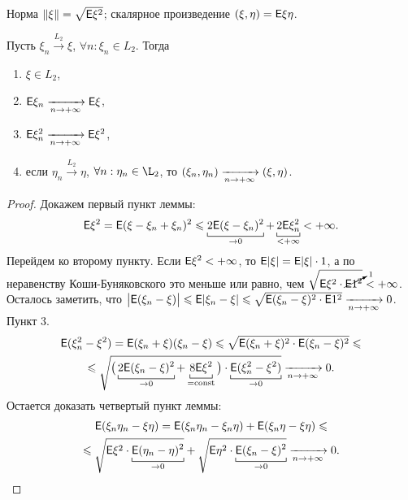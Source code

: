 Норма $ \| \xi \| = \sqrt{\mathsf{E} \xi^2}$;  скалярное произведение $(\xi, \eta) = \mathsf{E} \xi\eta$.
\begin{lemma}
	Пусть $\xi_n \xrightarrow{L_2} \xi$, $\forall n: \xi_n \in L_2$. Тогда
	\begin{enumerate}
		\item $\xi \in L_2$,
		\item $\mathsf{E}\xi_n \xrightarrow[n \rightarrow + \infty]{} \mathsf{E} \xi$,
		\item $\mathsf{E} \xi_n^2 \xrightarrow[n \rightarrow + \infty]{} \mathsf{E}\xi^2$,
		\item {если $\eta_n \xrightarrow{L_2} \eta$, $\forall n: \eta_n \in \L_2$, то $(\xi_n, \eta_n) \xrightarrow[n \rightarrow + \infty]{} (\xi, \eta)$.}
	\end{enumerate}
	\begin{proof}
		Докажем первый пункт леммы:
		$$\E \xi^2 = \E ( \xi - \xi_n + \xi_n)^2 \leqslant \underbracket[0.5pt]{2\E( \xi - \xi_n)^2}_{\rightarrow 0} + \underbracket[0.5pt]{2\E \xi_n^2}_{< + \infty} < +\infty.$$
		Перейдем ко второму пункту. Если $\mathsf{E} \xi^2 < + \infty$, то $\mathsf{E} | \xi | = \mathsf{E} | \xi| \cdot 1$, а по неравенству Коши-Буняковского это меньше или равно, чем $\sqrt{\mathsf{E} \xi^2 \cdot \cancelto{1}{\mathsf{E} 1^2}} < + \infty$. Осталось заметить, что $\big| \mathsf{E} ( \xi_n - \xi ) \big| \leqslant \mathsf{E} | \xi_n - \xi | \leqslant \sqrt{\mathsf{E} (\xi_n - \xi)^2 \cdot \mathsf{E} 1^2} \xrightarrow[n \rightarrow + \infty]{} 0$.
		Пункт 3. 
		\begin{multline*}
			\E ( \xi_n^2 - \xi^2) = 
			\E ( \xi_n + \xi)(\xi_n - \xi) \leqslant \sqrt{ \E (\xi_n + \xi)^2 \cdot \E (\xi_n - \xi)^2} \leqslant \\ \leqslant
			 \sqrt{\big( \underbracket[0.5pt]{2 \E( \xi_n - \xi)^2}_{\rightarrow 0} + \underbracket[0.5pt]{8\E \xi^2}_{=\const} \big) \cdot \underbracket[0.5pt]{\E (\xi_n^2 - \xi^2)}_{\rightarrow 0}} \limn 0.
		\end{multline*}
		Остается доказать четвертый пункт леммы:
		\begin{multline*}
			\E ( \xi_n \eta_n - \xi \eta) = 
			\E( \xi_n \eta_n - \xi_n \eta) + \E( \xi_n \eta - \xi \eta) \leqslant  \\ \leqslant
			\sqrt{\E\xi^2 \cdot \underbracket[0.5pt]{\E (\eta_n - \eta)^2}_{\rightarrow 0}} + \sqrt{\E \eta^2 \cdot \underbracket[0.5pt]{\E(\xi_n - \xi)^2}_{\rightarrow 0}} \limn 0.
		\end{multline*}
	\end{proof}
\end{lemma}
